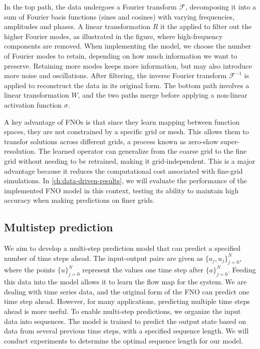 In the top path, the data undergoes a Fourier transform $\mathcal{F}$, decomposing it into a sum of Fourier basis functions (sines and cosines) with varying frequencies, amplitudes and phases.
A linear transformation $R$ it the applied to filter out the higher Fourier modes, as illustrated in the figure, where high-frequency components are removed.
When implementing the model, we choose the number of Fourier modes to retain, depending on how much information we want to preserve.
Retaining more modes keeps more information, but may also introduce more noise and oscillations.
After filtering, the inverse Fourier transform $\mathcal{F}^{-1}$ is applied to reconstruct the data in its original form.
The bottom path involves a linear transformation $W$, and the two paths merge before applying a non-linear activation function $\sigma$.

A key advantage of FNOs is that since they learn mapping between function spaces, they are not constrained by a specific grid or mesh.
This allows them to transfor solutions across different grids, a process known as zero-show super-resolution.
The learned operator can generalize from the coarse grid to the fine grid without needing to be retrained, making it grid-independent.
This is a major advantage because it reduces the computational cost associated with fine-grid simulations.
In \autoref{ch:data-driven-results}, we will evaluate the performance of the implemented FNO model in this context, testing its ability to maintain high accuracy when making predictions on finer grids.

\subsection*{Multistep prediction}
We aim to develop a multi-step prediction model that can predict a specified number of time steps ahead.
The input-output pairs are given as $\{a_j, u_j\}_{j=0}^N$, where the points $\{u\}_{j=0}^N$ represent the values one time step after $\{a\}_{j=0}^N$.
Feeding this data into the model allows it to learn the flow map for the system.
We are dealing with time series data, and the original form of the FNO can predict one time step ahead.
However, for many applications, predicting multiple time steps ahead is more useful.
To enable multi-step predictions, we organize the input data into sequences.
The model is trained to predict the output state based on data from several previous time steps, with a specified sequence length.
We will conduct experiments to determine the optimal sequence length for our model.

